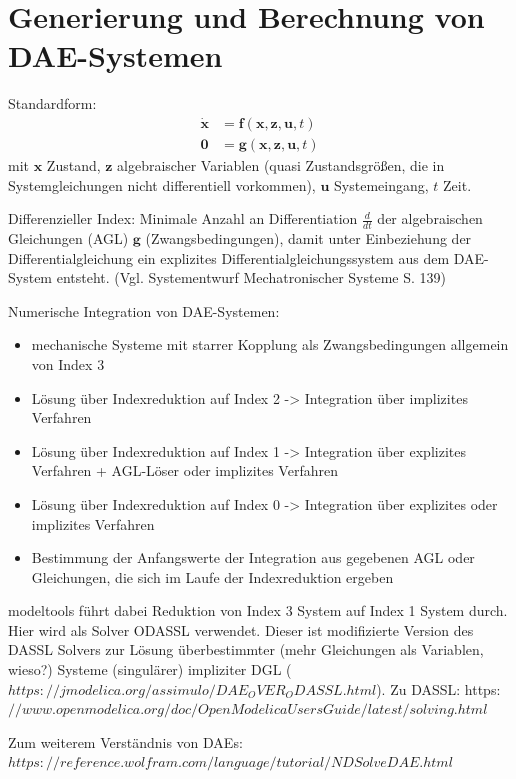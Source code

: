 \section{Generierung und Berechnung von DAE-Systemen}
Standardform:
	\begin{align}\label{eq:dae_std}
		\pmb{\dot{x}} &= \pmb{f}(\pmb{x}, \pmb{z}, \pmb{u}, t) \\
		\pmb{0} &= \pmb{g}(\pmb{x}, \pmb{z}, \pmb{u}, t)
	\end{align}
mit $\pmb{x}$ Zustand, $\pmb{z}$ algebraischer Variablen (quasi Zustandsgrößen, die in Systemgleichungen nicht differentiell vorkommen), $\pmb{u}$ Systemeingang, $t$ Zeit.

Differenzieller Index: Minimale Anzahl an Differentiation $\frac{d}{dt}$ der algebraischen Gleichungen (AGL) $\pmb{g}$ (Zwangsbedingungen), damit unter Einbeziehung der Differentialgleichung ein explizites Differentialgleichungssystem aus dem DAE-System entsteht. (Vgl. Systementwurf Mechatronischer Systeme S. 139)

Numerische Integration von DAE-Systemen: 
\begin{itemize}
\item mechanische Systeme mit starrer Kopplung als Zwangsbedingungen allgemein von Index 3
\item Lösung über Indexreduktion auf Index 2 -> Integration über implizites Verfahren
\item Lösung über Indexreduktion auf Index 1 -> Integration über explizites Verfahren + AGL-Löser oder implizites Verfahren
\item Lösung über Indexreduktion auf Index 0 -> Integration über explizites oder implizites Verfahren
\item Bestimmung der Anfangswerte der Integration aus gegebenen AGL oder Gleichungen, die sich im Laufe der Indexreduktion ergeben
\end{itemize}

modeltools führt dabei Reduktion von Index 3 System auf Index 1 System durch.
Hier wird als Solver ODASSL verwendet. Dieser ist modifizierte Version des DASSL Solvers zur Lösung überbestimmter (mehr Gleichungen als Variablen, wieso?) Systeme (singulärer) impliziter DGL ($https://jmodelica.org/assimulo/DAE_OVER_ODASSL.html$). Zu DASSL: https:$//www.openmodelica.org/doc/OpenModelicaUsersGuide/latest/solving.html$

Zum weiterem Verständnis von DAEs: $https://reference.wolfram.com/language/tutorial/NDSolveDAE.html$

